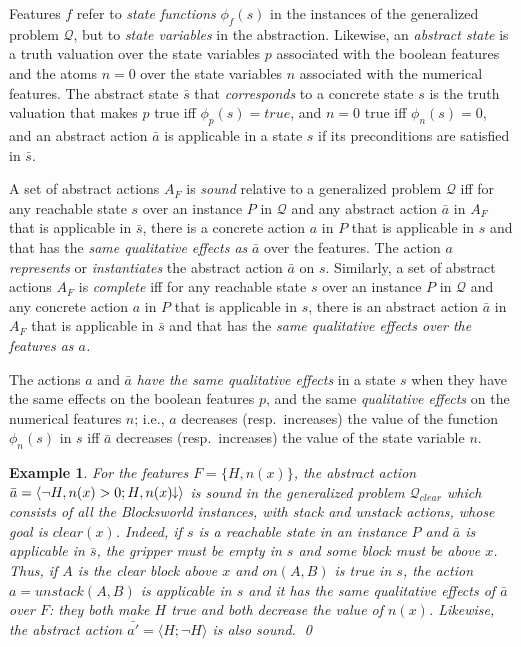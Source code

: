 \documentclass[letterpaper]{article} %
\newcommand{\tup}[1]{\langle #1 \rangle}
\newtheorem{example}[definition]{Example}
\newcommand{\Q}{\mathcal{Q}}
\newcommand{\abst}[2]{\tup{#1;#2}}
\newcommand{\mminus}{\hspace{-.05em}\raisebox{.15ex}{\footnotesize$\downarrow$}}
\begin{document}
Features $f$ refer to \emph{state functions} $\phi_f(s)$ in the instances
of the generalized problem $\Q$, but to \emph{state variables} in the
abstraction. Likewise, an \emph{abstract state} is  a truth valuation over
the state variables $p$ associated with the boolean features and the atoms
$n=0$ over the state variables $n$ associated with the numerical features.
The abstract state $\bar{s}$ that \emph{corresponds} to a concrete state $s$
is the truth valuation that makes $p$ true iff $\phi_p(s)=true$, and $n=0$
true iff $\phi_n(s) = 0$, and an abstract action $\bar{a}$ is applicable in
a state $s$ if its preconditions are satisfied in $\bar{s}$.

A set of abstract actions $A_F$ is \emph{sound} relative to a generalized
problem $\Q$ iff for any reachable state $s$ over an instance $P$ in $\Q$
and any abstract action $\bar{a}$ in $A_F$ that is applicable in $\bar{s}$,
there is a concrete action $a$ in $P$ that is applicable in $s$ and that
has the \emph{same qualitative effects as} $\bar{a}$ over the features.
The action $a$ \emph{represents} or \emph{instantiates} the abstract action
$\bar{a}$ on $s$. 
%
Similarly, a set of abstract actions $A_F$ is \emph{complete} iff for any
reachable state $s$ over an instance $P$ in $\Q$ and any concrete action $a$
in $P$ that is applicable in $s$, there is an abstract action $\bar{a}$ in
$A_F$ that is applicable in $\bar{s}$ and that has the \emph{same qualitative
effects over the features as $a$.}

The actions $a$ and $\bar{a}$ \emph{have the same qualitative effects} in
a state $s$ when they have the same effects on the boolean features $p$,
and the same \emph{qualitative effects} on the numerical features $n$; i.e.,
$a$ decreases (resp.\ increases) the value of the function $\phi_n(s)$ in
$s$ iff $\bar{a}$ decreases (resp.\ increases) the value of the state
variable  $n$.

\begin{example}
  For the features $F=\{H,n(x)\}$, the abstract action $\bar{a}=\abst{\neg H,n(x)>0}{H,n(x)\mminus}$ 
  is sound in the generalized problem $\Q_{clear}$ which consists of all
  the Blocksworld instances, with stack and unstack actions, whose goal
  is $clear(x)$.
  Indeed, if $s$ is a reachable state in an instance $P$ and $\bar{a}$ is
  applicable in $\bar{s}$, the gripper must be empty in $s$ and some
  block must be above $x$. Thus, if $A$ is the clear block above $x$ and
  $on(A,B)$ is true in $s$, the action $a=unstack(A,B)$ is applicable in
  $s$ and it has the same qualitative effects of $\bar{a}$ over $F$: they
  both make $H$ true and both decrease the value of $n(x)$.
  Likewise, the abstract action $\bar{a'}=\abst{H}{\neg H}$ is also sound. \qed
\end{example}
\end{document}
